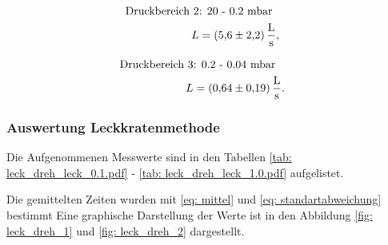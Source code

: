 \begin{align}
  \label{eq:dreh_leit_2}
  \begin{aligned}
  \text{Druckbereich 2} &\text{: 20 - 0.2 mbar}& \\
   L&=\SI{5.6\pm 2.2}{\litre\per\second},
\end{aligned}
\end{align}

\begin{align}
  \label{eq:dreh_leit_3}
  \begin{aligned}
  \text{Druckbereich 3} &\text{: 0.2 - 0.04 mbar}& \\
   L&=\SI{0.64\pm 0.19}{\litre\per\second}.
\end{aligned}
\end{align}

\subsubsection{Auswertung Leckkratenmethode}

Die Aufgenommenen Messwerte sind in den Tabellen \ref{tab: leck_dreh_leck_0.1.pdf} - \ref{tab: leck_dreh_leck_1.0.pdf} aufgelistet.





Die gemittelten Zeiten wurden mit \eqref{eq: mittel} und \eqref{eq: standartabweichung} bestimmt
Eine graphische Darstellung der Werte ist in den Abbildung \ref{fig: leck_dreh_1} und \ref{fig: leck_dreh_2} dargestellt.

